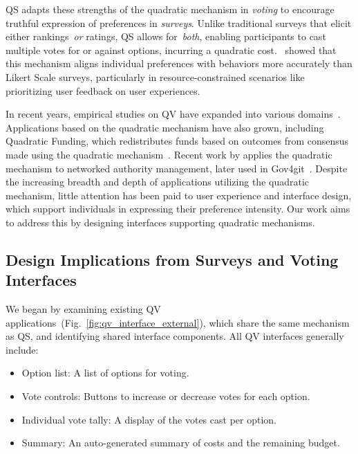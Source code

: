 QS adapts these strengths of the quadratic mechanism in \textit{voting} to encourage truthful expression of preferences in \textit{surveys}. Unlike traditional surveys that elicit either rankings~\textit{or} ratings, QS allows for~\textit{both}, enabling participants to cast multiple votes for or against options, incurring a quadratic cost.~\textcite{chengCanShowWhat2021} showed that this mechanism aligns individual preferences with behaviors more accurately than Likert Scale surveys, particularly in resource-constrained scenarios like prioritizing user feedback on user experiences.

In recent years, empirical studies on QV have expanded into various domains~\cite{naylor2017first, cavailleWhoCaresMeasuring}. Applications based on the quadratic mechanism have also grown, including Quadratic Funding, which redistributes funds based on outcomes from consensus made using the quadratic mechanism~\cite{buterinFlexibleDesignFunding2019a, freitasQuadraticFundingIncomplete2024}. Recent work by \textcite{southPluralManagement2024} applies the quadratic mechanism to networked authority management, later used in Gov4git~\cite{Gov4gitDecentralizedPlatform2023}. Despite the increasing breadth and depth of applications utilizing the quadratic mechanism, little attention has been paid to user experience and interface design, which support individuals in expressing their preference intensity. Our work aims to address this by designing interfaces supporting quadratic mechanisms.


\subsection{Design Implications from Surveys and Voting Interfaces}
We began by examining existing QV applications~(Fig.~\ref{fig:qv_interface_external}), which share the same mechanism as QS, and identifying shared interface components. All QV interfaces generally include:

\begin{itemize}
    \item Option list: A list of options for voting.
    \item Vote controls: Buttons to increase or decrease votes for each option.
    \item Individual vote tally: A display of the votes cast per option.
    \item Summary: An auto-generated summary of costs and the remaining budget.
\end{itemize}

